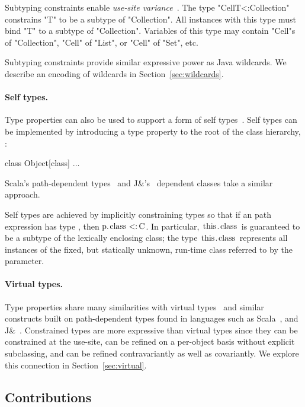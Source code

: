 \documentclass[preprint,nocopyrightspace,9pt]{sigplanconf}
\begin{document}
Subtyping constraints enable \emph{use-site variance}~\cite{variance}.
The type \xcd"Cell{T<:Collection}"
constrains \xcd"T" to be a subtype of \xcd"Collection".
All instances with this type must bind \xcd"T" to a subtype of
\xcd"Collection".
Variables of this type may contain \xcd"Cell"s of
\xcd"Collection", \xcd"Cell" of \xcd"List",
or \xcd"Cell" of \xcd"Set", etc.

Subtyping constraints provide similar expressive power as Java
wildcards.  We describe an encoding of wildcards in
Section~\ref{sec:wildcards}. 

\paragraph{Self types.}
Type properties can also be used to support a form of self
types~\cite{bruce-binary,bsg95}.
%
Self types can be implemented by introducing a
type property  to the root of the class hierarchy, :
\begin{xtenmath}
class Object[class] { $\dots$ }
\end{xtenmath}
Scala's path-dependent types~\cite{scala} and J\&'s~\cite{nqm06}
dependent classes
take a similar approach.

Self types are achieved by
implicitly constraining types so that if an path expression 
has type , then
$\Xcd{p}.\Xcd{class} \subtype \Xcd{C}$.  In particular,
$\Xcd{this}.\Xcd{class}$ is guaranteed to be a subtype
of the lexically enclosing class; the type
$\Xcd{this}.\Xcd{class}$ represents all instances of the fixed,
but statically unknown, run-time class referred to by the 
parameter.

\paragraph{Virtual types.}

Type properties share many similarities with virtual
types~\cite{mp89-virtual-classes,beta,ernst99-gbeta,ernst06-virtual,cdnw07-tribe}
and similar constructs built on path-dependent types found in
languages such as Scala~\cite{scala}, and J\&~\cite{nqm06}.
%
Constrained types are more expressive than virtual
types since they can be constrained at the use-site,
can be refined on a per-object basis without explicit subclassing,
and can be refined contravariantly
as well as covariantly.  We explore this connection in
Section~\ref{sec:virtual}.

\subsection{Contributions}
\end{document}
